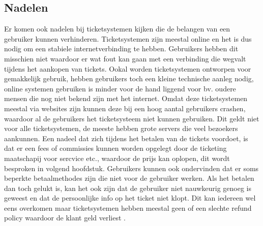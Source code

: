 \subsection{Nadelen}
Er komen ook nadelen bij ticketsystemen kijken die de belangen van een gebruiker kunnen verhinderen. Ticketsystemen zijn meestal online en het is dus nodig om een stabiele internetverbinding te hebben.
Gebruikers hebben dit misschien niet waardoor er wat fout kan gaan met een verbinding die wegvalt tijdens het aankopen van tickets. Ookal worden ticketsystemen ontworpen voor gemakkelijk gebruik,
hebben gebruikers toch een kleine technische aanleg nodig, online systemen gebruiken is minder voor de hand liggend voor bv. oudere mensen die nog niet bekend zijn met het internet.
Omdat deze ticketsystemen meestal via websites zijn kunnen deze bij een hoog aantal gebruikers crashen, waardoor al de gebruikers het ticketsysteem niet kunnen gebruiken. Dit geldt niet voor alle ticketsystemen, de meeste hebben grote servers die veel bezoekers aankunnen.
Een nadeel dat zich tijdens het betalen van de tickets voordoet, is dat er een fees of commissies kunnen worden opgelegt door de ticketing maatschapij voor sercvice etc., waardoor de prijs kan oplopen, dit wordt besproken in volgend hoofdstuk.
Gebruikers kunnen ook ondervinden dat er soms beperkte betaalmethodes zijn die niet voor de gebruiker werken. Als het betalen dan toch gelukt is, kan het ook zijn dat de gebruiker niet nauwkeurig genoeg is geweest en dat de persoonlijke info op het ticket niet klopt.
Dit kan iedereen wel eens overkomen maar ticketsystemen hebben meestal geen of een slechte refund policy waardoor de klant geld verliest \cite{concert-tickets-online2021}. 

